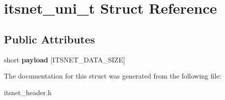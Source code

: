 \hypertarget{structitsnet__uni__t}{\section{itsnet\-\_\-uni\-\_\-t \-Struct \-Reference}
\label{structitsnet__uni__t}
}
\subsection*{\-Public \-Attributes}
\begin{DoxyCompactItemize}
\item 
\hypertarget{structitsnet__uni__t_aa8641d21334b54b4165f2490f3164f8a}{short {\bfseries payload} \mbox{[}\-I\-T\-S\-N\-E\-T\-\_\-\-D\-A\-T\-A\-\_\-\-S\-I\-Z\-E\mbox{]}}\label{structitsnet__uni__t_aa8641d21334b54b4165f2490f3164f8a}

\end{DoxyCompactItemize}


\-The documentation for this struct was generated from the following file\-:\begin{DoxyCompactItemize}
\item 
itsnet\-\_\-header.\-h\end{DoxyCompactItemize}
